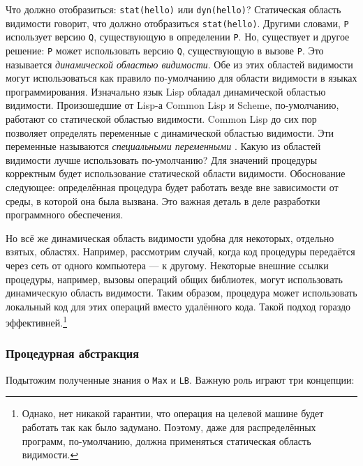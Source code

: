 Что должно отобразиться: \lstinline|stat(hello)| или \lstinline|dyn(hello)|? Статическая область видимости говорит, что должно отобразиться \lstinline|stat(hello)|. Другими словами, \lstinline|P| использует версию \lstinline|Q|, существующую в определении \lstinline|P|. Но, существует и другое решение: \lstinline|P| может использовать версию \lstinline|Q|, существующую в вызове \lstinline|P|. Это называется \emph{динамической областью видимости}. Обе из этих областей видимости могут использоваться как правило по-умолчанию для области видимости в языках программирования. Изначально язык Lisp обладал динамической областью видимости. Произошедшие от Lisp-а Common Lisp и Scheme, по-умолчанию, работают со статической областью видимости. Common Lisp до сих пор позволяет определять переменные с динамической областью видимости. Эти переменные называются \emph{специальными переменными} \cite{181}. Какую из областей видимости лучше использовать по-умолчанию? Для значений процедуры корректным будет использование статической области видимости. Обоснование следующее: определённая процедура будет работать везде вне зависимости от среды, в которой она была вызвана. Это важная деталь в деле разработки программного обеспечения.

Но всё же динамическая область видимости удобна для некоторых, отдельно взятых, областях. Например, рассмотрим случай, когда код процедуры передаётся через сеть от одного компьютера --- к другому. Некоторые внешние ссылки процедуры, например, вызовы операций общих библиотек, могут использовать динамическую область видимости. Таким образом, процедура может использовать локальный код для этих операций вместо удалённого кода. Такой подход гораздо эффективней.\footnote{Однако, нет никакой гарантии, что операция на целевой машине будет работать так как было задумано. Поэтому, даже для распределённых программ, по-умолчанию, должна применяться статическая область видимости.}



\subsubsection{Процедурная абстракция}

Подытожим полученные знания о \lstinline|Max| и \lstinline|LB|. Важную роль играют три концепции:

